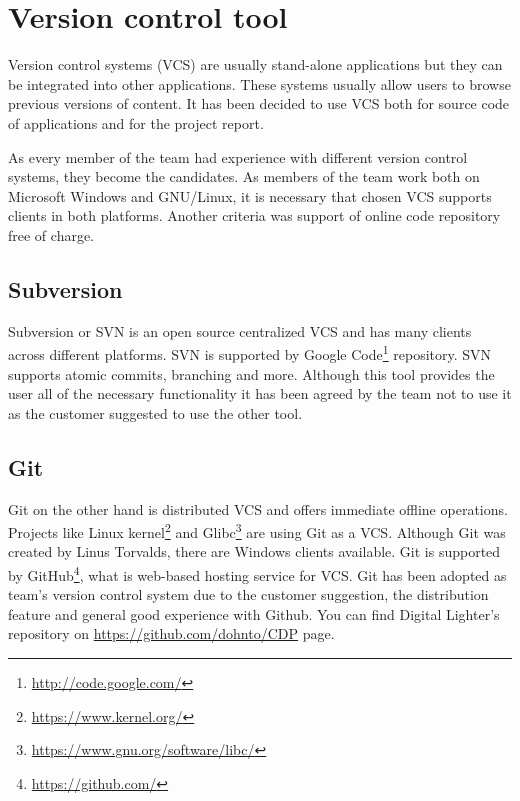 
\section{Version control tool}
\label{sec:vcs}
Version control systems (VCS) are usually stand-alone applications but they can be integrated into other applications. These systems usually allow users to browse previous versions of content. It has been decided to use VCS both for source code of applications and for the project report. 

As every member of the team had experience with different version control systems, they become the candidates. As members of the team work both on Microsoft Windows and GNU/Linux, it is necessary that chosen VCS supports clients in both platforms. Another criteria was support of online code repository free of charge.


\subsection{Subversion}
Subversion or SVN is an open source centralized VCS and has many clients across different platforms. 
SVN is supported by Google Code\footnote{\url{http://code.google.com/}} repository.
SVN supports atomic commits, branching and more. Although this tool provides the user all of the necessary functionality it has been agreed by the team not to use it as the customer suggested to use the other tool.


\subsection{Git}
Git on the other hand is distributed VCS and offers immediate offline operations.
Projects like Linux kernel\footnote{\url{https://www.kernel.org/}} and Glibc\footnote{\url{https://www.gnu.org/software/libc/}} are using Git as a VCS.
Although Git was created by Linus Torvalds, there are Windows clients available.
Git is supported by GitHub\footnote{\url{https://github.com/}}, what is web-based hosting service for VCS. Git has been adopted as team's version control system due to the customer suggestion, the distribution feature and general good experience with Github.
You can find Digital Lighter's repository on \url{https://github.com/dohnto/CDP} page.

